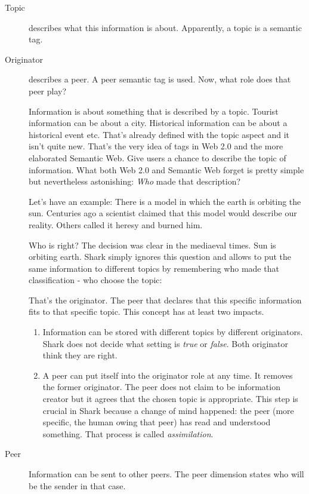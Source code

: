 \begin{description}
    \item[Topic] describes what this information is about. Apparently, a topic is a semantic tag. 
    \item[Originator] describes a peer. A peer semantic tag is used. Now, what role does that peer play? 

Information is about something that is described by a topic. Tourist information can be about a city. Historical information can be about a historical event etc. That's already defined with the topic aspect and it isn't quite new. That's the very idea of tags in Web 2.0 and the more elaborated Semantic Web. Give users a chance to describe the topic of information. What both Web 2.0 and Semantic Web forget is pretty simple but nevertheless astonishing:
{\it Who} made that description?

Let's have an example:
There is a model in which the earth is orbiting the sun. Centuries ago a scientist claimed that this model would describe our reality. Others called it heresy and burned him.  

Who is right? The decision was clear in the  mediaeval times. Sun is orbiting earth. Shark simply ignores this question and allows to put the same information to different topics by remembering who made that classification - who choose the topic:

That's the originator. The peer that declares that this specific information fits to that specific topic. This concept has at least two impacts.

\begin{enumerate}
\item 
Information can be stored with different topics by different originators. Shark does not decide what setting is {\it true} or {\it false}. Both originator think they are right.

\item 
A peer can put itself into the originator role at any time. It removes the former originator. The peer does not claim to be information creator but it agrees that the chosen topic is appropriate. This step is crucial in Shark because a change of mind happened: the peer (more specific, the human owing that peer) has read and understood something. That process is called {\it assimilation}.
\end{enumerate}

    \item[Peer] Information can be sent to other peers. The peer dimension states who will be the sender in that case.


\end{description}
